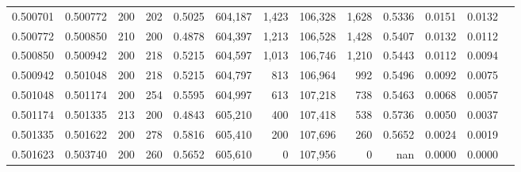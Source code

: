 \begin{tabular}{rrrrrrrrrrrrr}
0.500701 & 0.500772 &   200 & 202 &                                     0.5025 & 604,187 &   1,423 & 106,328 &   1,628 & 0.5336 & 0.0151 & 0.0132 \\
0.500772 & 0.500850 &   210 & 200 &                                     0.4878 & 604,397 &   1,213 & 106,528 &   1,428 & 0.5407 & 0.0132 & 0.0112 \\
0.500850 & 0.500942 &   200 & 218 &                                     0.5215 & 604,597 &   1,013 & 106,746 &   1,210 & 0.5443 & 0.0112 & 0.0094 \\
0.500942 & 0.501048 &   200 & 218 &                                     0.5215 & 604,797 &     813 & 106,964 &     992 & 0.5496 & 0.0092 & 0.0075 \\
0.501048 & 0.501174 &   200 & 254 &                                     0.5595 & 604,997 &     613 & 107,218 &     738 & 0.5463 & 0.0068 & 0.0057 \\
0.501174 & 0.501335 &   213 & 200 &                                     0.4843 & 605,210 &     400 & 107,418 &     538 & 0.5736 & 0.0050 & 0.0037 \\
0.501335 & 0.501622 &   200 & 278 &                                     0.5816 & 605,410 &     200 & 107,696 &     260 & 0.5652 & 0.0024 & 0.0019 \\
0.501623 & 0.503740 &   200 & 260 &                                     0.5652 & 605,610 &       0 & 107,956 &       0 &    nan & 0.0000 & 0.0000 \\
\bottomrule
\end{tabular}
